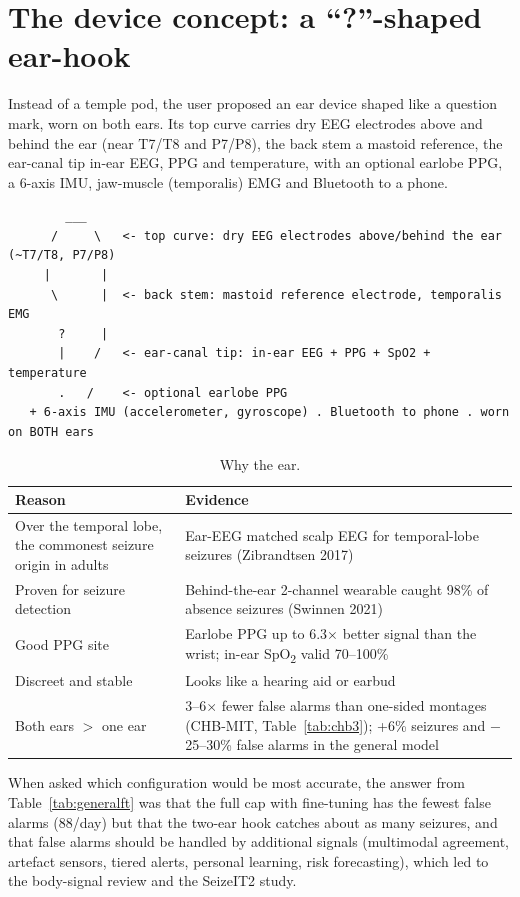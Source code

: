 \section{The device concept: a ``?''-shaped ear-hook}
\label{sec:device}

Instead of a temple pod, the user proposed an ear device shaped like a question mark, worn on both ears. Its top curve carries dry EEG electrodes above and behind the ear (near T7/T8 and P7/P8), the back stem a mastoid reference, the ear-canal tip in-ear EEG, PPG and temperature, with an optional earlobe PPG, a 6-axis IMU, jaw-muscle (temporalis) EMG and Bluetooth to a phone.

{\footnotesize
\begin{verbatim}
        ___
      /     \   <- top curve: dry EEG electrodes above/behind the ear (~T7/T8, P7/P8)
     |       |
      \      |  <- back stem: mastoid reference electrode, temporalis EMG
       ?     |
       |    /   <- ear-canal tip: in-ear EEG + PPG + SpO2 + temperature
       .   /    <- optional earlobe PPG
   + 6-axis IMU (accelerometer, gyroscope) . Bluetooth to phone . worn on BOTH ears
\end{verbatim}
}

\begin{table}[H]
\centering\small
\caption{Why the ear.}
\begin{tabularx}{\linewidth}{@{}l L@{}}
\toprule
Reason & Evidence \\
\midrule
Over the temporal lobe, the commonest seizure origin in adults & Ear-EEG matched scalp EEG for temporal-lobe seizures (Zibrandtsen 2017) \\
Proven for seizure detection & Behind-the-ear 2-channel wearable caught 98\% of absence seizures (Swinnen 2021) \\
Good PPG site & Earlobe PPG up to 6.3$\times$ better signal than the wrist; in-ear SpO\textsubscript{2} valid 70--100\% \\
Discreet and stable & Looks like a hearing aid or earbud \\
Both ears $>$ one ear & 3--6$\times$ fewer false alarms than one-sided montages (CHB-MIT, Table~\ref{tab:chb3}); +6\% seizures and $-$25--30\% false alarms in the general model \\
\bottomrule
\end{tabularx}
\end{table}

When asked which configuration would be most accurate, the answer from Table~\ref{tab:generalft} was that the full cap with fine-tuning has the fewest false alarms (88/day) but that the two-ear hook catches about as many seizures, and that false alarms should be handled by additional signals (multimodal agreement, artefact sensors, tiered alerts, personal learning, risk forecasting), which led to the body-signal review and the SeizeIT2 study.


